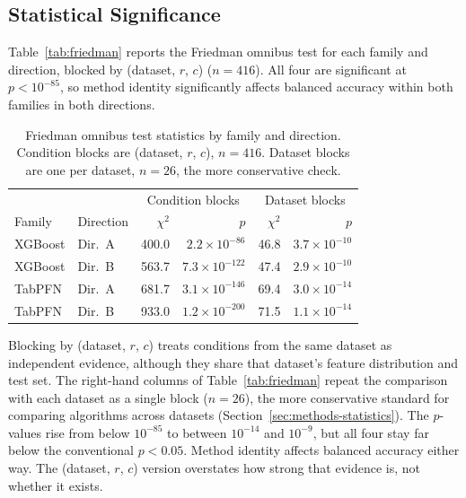 \subsection{Statistical Significance}
\label{sec:results-significance}

Table~\ref{tab:friedman} reports the Friedman omnibus test for each family and
direction, blocked by (dataset, $r$, $c$) ($n{=}416$). All four are significant at
$p<10^{-85}$, so method identity significantly affects balanced accuracy within both
families in both directions.

\begin{table}[t]
\centering
\caption{Friedman omnibus test statistics by family and direction. Condition
blocks are (dataset, $r$, $c$), $n{=}416$. Dataset blocks are one per dataset,
$n{=}26$, the more conservative check.}
\label{tab:friedman}
\label{tab:friedman-dataset}
\begin{tabular}{@{}llrrrr@{}}
\toprule
& & \multicolumn{2}{c}{Condition blocks} & \multicolumn{2}{c}{Dataset blocks} \\
Family & Direction & $\chi^2$ & $p$ & $\chi^2$ & $p$ \\
\midrule
XGBoost & Dir.\ A & 400.0 & $2.2\times10^{-86}$ & 46.8 & $3.7\times10^{-10}$ \\
XGBoost & Dir.\ B & 563.7 & $7.3\times10^{-122}$ & 47.4 & $2.9\times10^{-10}$ \\
TabPFN  & Dir.\ A & 681.7 & $3.1\times10^{-146}$ & 69.4 & $3.0\times10^{-14}$ \\
TabPFN  & Dir.\ B & 933.0 & $1.2\times10^{-200}$ & 71.5 & $1.1\times10^{-14}$ \\
\bottomrule
\end{tabular}
\end{table}

Blocking by (dataset, $r$, $c$) treats conditions from the same dataset as
independent evidence, although they share that dataset's feature distribution and
test set. The right-hand columns of Table~\ref{tab:friedman} repeat the comparison
with each dataset as a single block ($n{=}26$), the more conservative standard for comparing algorithms
across datasets (Section~\ref{sec:methods-statistics}). The $p$-values rise from
below $10^{-85}$ to between $10^{-14}$ and $10^{-9}$, but all four stay far below the
conventional $p<0.05$. Method identity affects balanced accuracy either way. The
(dataset, $r$, $c$) version overstates how strong that evidence is, not whether it
exists.

